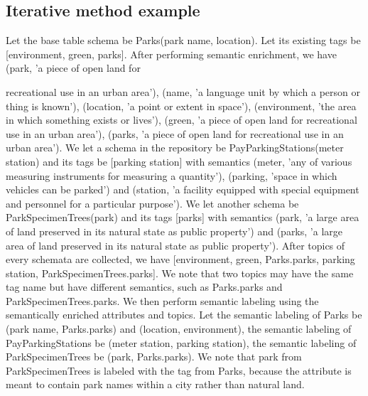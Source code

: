 \subsection{Iterative method example}
\label{ssec:IterativeMethodExample2}

Let the base table schema be Parks(park name, location). Let its existing tags be [environment, green, parks]. After performing semantic enrichment, we have (park, 'a piece of open land for

recreational use in an urban area'), (name, 'a language unit by which a person or thing is known'), (location, 'a point or extent in space'), (environment, 'the area in which something exists or lives'), (green, 'a piece of open land for recreational use in an urban area'), (parks, 'a piece of open land for recreational use in an urban area').
We let a schema in the repository be PayParkingStations(meter station) and its tags be [parking station] with semantics (meter, 'any of various measuring instruments for measuring a quantity'), (parking, 'space in which vehicles can be parked') and (station, 'a facility equipped with special equipment and personnel for a particular purpose'). We let another schema be ParkSpecimenTrees(park) and its tags [parks] with semantics (park, 'a large area of land preserved in its natural state as public property') and (parks, 'a large area of land preserved in its natural state as public property').
After topics of every schemata are collected, we have [environment, green, Parks.parks, parking station, ParkSpecimenTrees.parks]. We note that two topics may have the same tag name but have different semantics, such as Parks.parks and ParkSpecimenTrees.parks. We then perform semantic labeling using the semantically enriched attributes and topics. Let the semantic labeling of Parks be (park name, Parks.parks) and (location, environment), the semantic labeling of PayParkingStations be (meter station, parking station), the semantic labeling of ParkSpecimenTrees be (park, Parks.parks). We note that park from ParkSpecimenTrees is labeled with the tag from Parks, because the attribute is meant to contain park names within a city rather than natural land.

